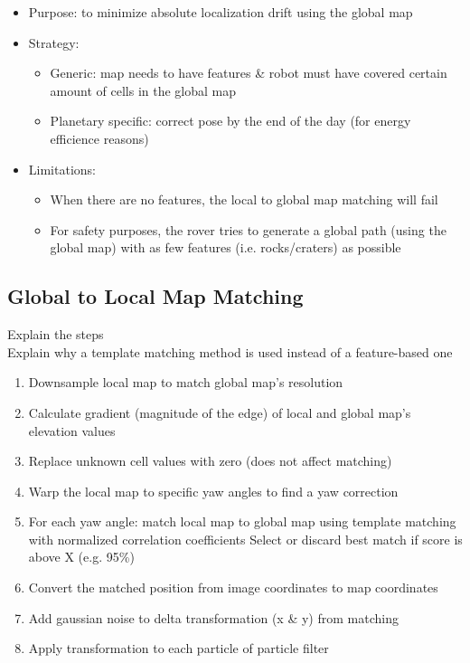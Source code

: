 \begin{itemize}
    \item Purpose: to minimize absolute localization drift using the global map
    \item Strategy:
        \begin{itemize}
            \item Generic: map needs to have features \& robot must have covered certain amount of cells in the global map
            \item Planetary specific: correct pose by the end of the day (for energy efficience reasons)
        \end{itemize}
    \item Limitations:
        \begin{itemize}
            \item When there are no features, the local to global map matching will fail
            \item For safety purposes, the rover tries to generate a global path (using the global map) with as few features (i.e. rocks/craters) as possible
        \end{itemize}
\end{itemize}

\subsection{Global to Local Map Matching}

Explain the steps\\
Explain why a template matching method is used instead of a feature-based one

\begin{enumerate}
    \item Downsample local map to match global map's resolution
    \item Calculate gradient (magnitude of the edge) of local and global map's elevation values
    \item Replace unknown cell values with zero (does not affect matching)
    \item Warp the local map to specific yaw angles to find a yaw correction
    \item For each yaw angle: match local map to global map using template matching with normalized correlation coefficients
 Select or discard best match if score is above X (e.g. 95\%)
    \item Convert the matched position from image coordinates to map coordinates
    \item Add gaussian noise to delta transformation (x \& y) from matching
    \item Apply transformation to each particle of particle filter
\end{enumerate}

